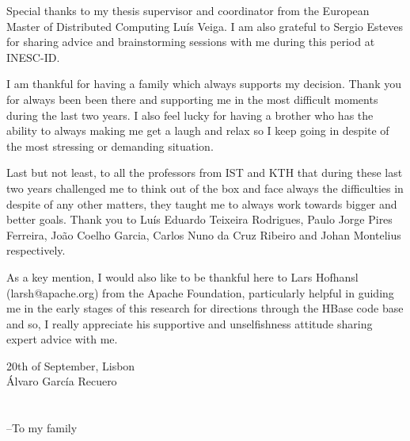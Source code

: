 Special thanks to my thesis supervisor and coordinator from the European Master of Distributed Computing Luís Veiga. I am also grateful to Sergio Esteves for sharing advice and brainstorming sessions with me during this period at INESC-ID.

I am thankful for having a family which always supports my decision. Thank you for always been been there and supporting me in the most difficult moments during the last two years. I also feel lucky for having a brother who has the ability to always making me get a laugh and relax so I keep going in despite of the most stressing or demanding situation.

Last but not least, to all the professors from IST and KTH that during these last two years challenged me to think out of the box and face always the difficulties in despite of any other matters, they taught me to always work towards bigger and better goals. Thank you to Luís Eduardo Teixeira Rodrigues, Paulo Jorge Pires Ferreira, João Coelho Garcia, Carlos Nuno da Cruz Ribeiro and Johan Montelius respectively.

As a key mention, I would also like to be thankful here to Lars Hofhansl (larsh@apache.org) from the Apache Foundation, particularly helpful in guiding me in the early stages of this research for directions through the HBase code base and so, I really appreciate his supportive and unselfishness attitude sharing expert advice with me.

\vspace{15pt}
\vfill
\begin{flushright}
  \begin{minipage}{8cm}
    \begin{center}
    20th of September, Lisbon \\ 
	Álvaro García Recuero
    \end{center}
  \end{minipage}
\end{flushright}

\cleardoublepage


\chapter*{}
\thispagestyle{empty}

\vfill
\mbox{}
\vfill\Large
\begin{flushright}
  \begin{minipage}{8cm}
    \begin{center}

--To my family

    \end{center}
  \end{minipage}
\end{flushright}
\normalsize\vfill

